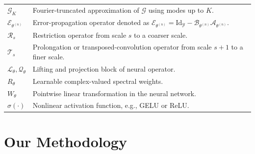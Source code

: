 \documentclass[preprint,numbers,sort&compress]{elsarticle}
\begin{document}
\begin{table}[t]
\begin{tabular}{ll}
				$\mathcal G_K$ & Fourier-truncated approximation of $\mathcal G$ using modes up to $K$. \\
				
				$\mathcal E_{{\theta}^{(n)}}$ & Error-propagation operator denoted as
				$\mathcal  E_{{\theta}^{(n)}}=\mathrm{Id}_{\mathcal Y}-\mathcal B_{\theta^{(n)}}\mathcal A_{\theta^{(n)}}$. \\
				
				$\mathcal R_s$ & Restriction operator from scale $s$ to a coarser scale. \\
				
				$\mathcal T_s$ & Prolongation or transposed-convolution operator from scale $s+1$ to a finer scale. \\
				$\mathcal{L}_{\theta}, \mathcal{Q}_{\theta}$ & Lifting and projection block of neural operator.  \\
				
				$R_\theta$ & Learnable complex-valued spectral weights. \\
				
				$W_\theta$ & Pointwise linear transformation in the neural network. \\
				
				$\sigma(\cdot)$ & Nonlinear activation function, e.g., GELU or ReLU. \\
				\hline
			\end{tabular}
		\end{table}
		
		\section{Our Methodology}\label{sec2}
		
\end{document}
